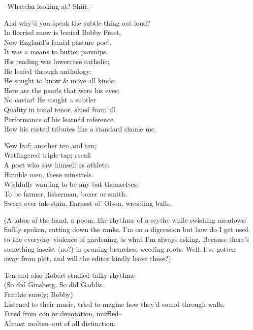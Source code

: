 --Whatchu looking at? Shiit.-- 

And why'd you speak the subtle thing out loud? \\
In florried snow is buried Bobby Frost, \\
New England's famèd pasture poet. \\

It was a means to butter parsnips. \\
His reading was lowercase catholic; \\ 
He leafed through anthology; \\
He sought to know \& move all kinds: \\
Here are the pearls that were his eyes: \\
No caviar! He sought a subtler \\
Quality in tonal tenor, shied from all \\
Performance of his learnéd reference. \\
How his rusted tributes like a standard shame me.

New leaf; another ten and ten; \\
Wetfingered triple-tap; recall \\
A poet who saw himself as athlete. \\
Humble men, these minstrels. \\
Wishfully wanting to be any but themselves: \\
To be farmer, fisherman, boxer or smith. \\
Sweat over ink-stain, Earnest ol' Olson, wrestling bulls.

(A labor of the hand, a poem, like rhythms of a scythe while swishing meadows: \\
Softly spoken, cutting down the ranks. I'm on a digression but how do I get used to the everyday violence of gardening, is what I'm always asking. Because there's something fascist (no?) in pruning branches, weeding roots. Well. I've gotten away from plot, and will the editor kindly leave these?)

Ten and also Robert studied talky rhythms \\
(So did Ginsberg. So did Gaddis. \\
Frankie surely; Bobby) \\
Listened to their music, tried to magine how they'd sound through walls, \\
Freed from con or denotation, muffled-- \\
Almost molten--out of all distinction.

